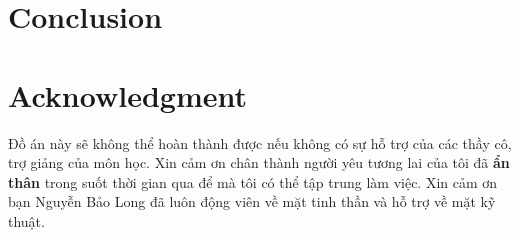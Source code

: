 \section{Conclusion}


\section*{Acknowledgment}
Đồ án này sẽ không thể hoàn thành được nếu không có sự hỗ trợ của các thầy cô, trợ giảng của môn học. Xin cảm ơn chân thành người yêu tương lai của tôi đã \textbf{ẩn thân} trong suốt thời gian qua để mà tôi có thể tập trung làm việc. Xin cảm ơn bạn Nguyễn Bảo Long đã luôn động viên về mặt tinh thần và hỗ trợ về mặt kỹ thuật.